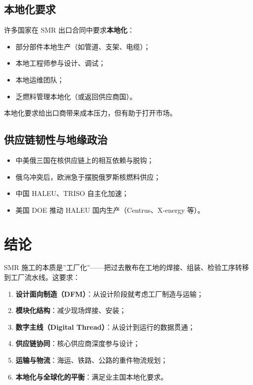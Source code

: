 \documentclass[
  UTF8,
  scheme=plain,
  fontsize=10pt,
  openany
]{ctexbook}
\begin{document}
\subsection{本地化要求}\label{ux672cux5730ux5316ux8981ux6c42}

许多国家在 SMR 出口合同中要求\textbf{本地化}：

\begin{itemize}
\tightlist
\item
  部分部件本地生产（如管道、支架、电缆）；
\item
  本地工程师参与设计、调试；
\item
  本地运维团队；
\item
  乏燃料管理本地化（或返回供应商国）。
\end{itemize}

本地化要求给出口商带来成本压力，但有助于打开市场。

\subsection{供应链韧性与地缘政治}\label{ux4f9bux5e94ux94feux97e7ux6027ux4e0eux5730ux7f18ux653fux6cbb}

\begin{itemize}
\tightlist
\item
  中美俄三国在核供应链上的相互依赖与脱钩；
\item
  俄乌冲突后，欧洲急于摆脱俄罗斯核燃料供应；
\item
  中国 HALEU、TRISO 自主化加速；
\item
  美国 DOE 推动 HALEU 国内生产（Centrus、X-energy 等）。
\end{itemize}

\section{结论}\label{ux7ed3ux8bba-6}

SMR
施工的本质是''工厂化''------把过去散布在工地的焊接、组装、检验工序转移到工厂流水线。这要求：

\begin{enumerate}
\def\labelenumi{\arabic{enumi}.}
\tightlist
\item
  \textbf{设计面向制造（DFM）}：从设计阶段就考虑工厂制造与运输；
\item
  \textbf{模块化结构}：减少现场焊接、安装；
\item
  \textbf{数字主线（Digital Thread）}：从设计到运行的数据贯通；
\item
  \textbf{供应链协同}：核心供应商深度参与设计；
\item
  \textbf{运输与物流}：海运、铁路、公路的重件物流规划；
\item
  \textbf{本地化与全球化的平衡}：满足业主国本地化要求。
\end{enumerate}
\end{document}
